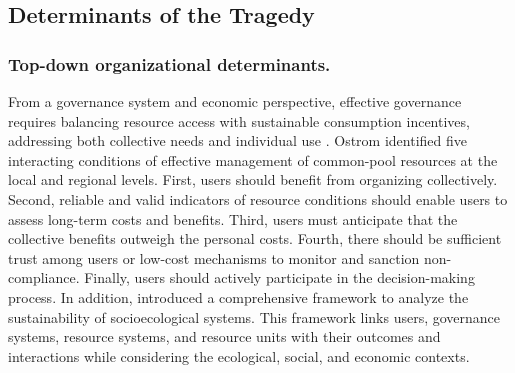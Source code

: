\subsection{Determinants of the Tragedy}
\subsubsection{Top-down organizational determinants.}
From a governance system and economic perspective, effective governance requires balancing resource access with sustainable consumption incentives, addressing both collective needs and individual use \cite{ostromRevisitingCommonsLocal1999,ostromGeneralFrameworkAnalyzing2009}. Ostrom \cite{ostromGeneralFrameworkAnalyzing2009} identified five interacting conditions of effective management of common-pool resources at the local and regional levels. First, users should benefit from organizing collectively. Second, reliable and valid indicators of resource conditions should enable users to assess long-term costs and benefits. Third, users must anticipate that the collective benefits outweigh the personal costs. Fourth, there should be sufficient trust among users or low-cost mechanisms to monitor and sanction non-compliance. Finally, users should actively participate in the decision-making process. In addition, \cite{ostromGeneralFrameworkAnalyzing2009} introduced a comprehensive framework to analyze the sustainability of socioecological systems. This framework links users, governance systems, resource systems, and resource units with their outcomes and interactions while considering the ecological, social, and economic contexts.

